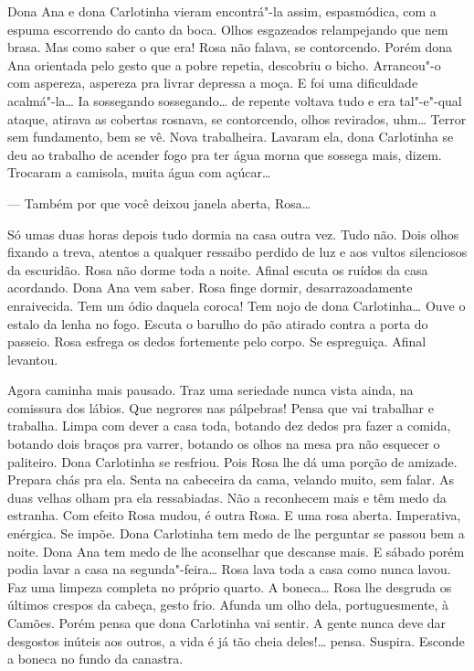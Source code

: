Dona Ana e dona Carlotinha vieram encontrá"-la assim, espasmódica, com a
espuma escorrendo do canto da boca. Olhos esgazeados relampejando que
nem brasa. Mas como saber o que era! Rosa não falava, se contorcendo.
Porém dona Ana orientada pelo gesto que a pobre repetia, descobriu o
bicho. Arrancou"-o com aspereza, aspereza pra livrar depressa a moça. E
foi uma dificuldade acalmá"-la\ldots{} Ia sossegando sossegando\ldots{} de repente
voltava tudo e era tal"-e"-qual ataque, atirava as cobertas rosnava, se
contorcendo, olhos revirados, uhm\ldots{} Terror sem fundamento, bem se vê.
Nova trabalheira. Lavaram ela, dona Carlotinha se deu ao trabalho de
acender fogo pra ter água morna que sossega mais, dizem. Trocaram a
camisola, muita água com açúcar\ldots{}

--- Também por que você deixou janela aberta, Rosa\ldots{}

Só umas duas horas depois tudo dormia na casa outra vez. Tudo não. Dois
olhos fixando a treva, atentos a qualquer ressaibo perdido de luz e aos
vultos silenciosos da escuridão. Rosa não dorme toda a noite. Afinal
escuta os ruídos da casa acordando. Dona Ana vem saber. Rosa finge
dormir, desarrazoadamente enraivecida. Tem um ódio daquela coroca! Tem
nojo de dona Carlotinha\ldots{} Ouve o estalo da lenha no fogo. Escuta o
barulho do pão atirado contra a porta do passeio. Rosa esfrega os dedos
fortemente pelo corpo. Se espreguiça. Afinal levantou.

Agora caminha mais pausado. Traz uma seriedade nunca vista ainda, na
comissura dos lábios. Que negrores nas pálpebras! Pensa que vai
trabalhar e trabalha. Limpa com dever a casa toda, botando dez dedos pra
fazer a comida, botando dois braços pra varrer, botando os olhos na mesa
pra não esquecer o paliteiro. Dona Carlotinha se resfriou. Pois Rosa lhe
dá uma porção de amizade. Prepara chás pra ela. Senta na cabeceira da
cama, velando muito, sem falar. As duas velhas olham pra ela
ressabiadas. Não a reconhecem mais e têm medo da estranha. Com efeito
Rosa mudou, é outra Rosa. E uma rosa aberta. Imperativa, enérgica. Se
impõe. Dona Carlotinha tem medo de lhe perguntar se passou bem a noite.
Dona Ana tem medo de lhe aconselhar que descanse mais. E sábado porém
podia lavar a casa na segunda"-feira\ldots{} Rosa lava toda a casa como nunca
lavou. Faz uma limpeza completa no próprio quarto. A boneca\ldots{} Rosa lhe
desgruda os últimos crespos da cabeça, gesto frio. Afunda um olho dela,
portuguesmente, à Camões. Porém pensa que dona Carlotinha vai sentir. A
gente nunca deve dar desgostos inúteis aos outros, a vida é já tão cheia
deles!\ldots{} pensa. Suspira. Esconde a boneca no fundo da canastra.

